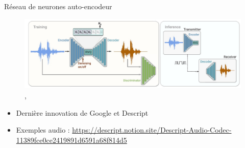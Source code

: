 \documentclass[9pt, aspectratio=169]{beamer}
\begin{document}
\begin{frame}{Réseau de neurones auto-encodeur} %

\begin{figure}
	\includegraphics[width=\0.8\textwidth]{fig/soundstream_architecture.jpg}
	\caption{\cite{zeghidour_soundstream_2022}, \cite{kumar_high-fidelity_2023}}
\end{figure}

\begin{itemize}
	\item Dernière innovation de Google et Descript
	\item Exemples audio : \url{https://descript.notion.site/Descript-Audio-Codec-11389fce0ce2419891d6591a68f814d5}
\end{itemize}

\end{frame}
\end{document}
